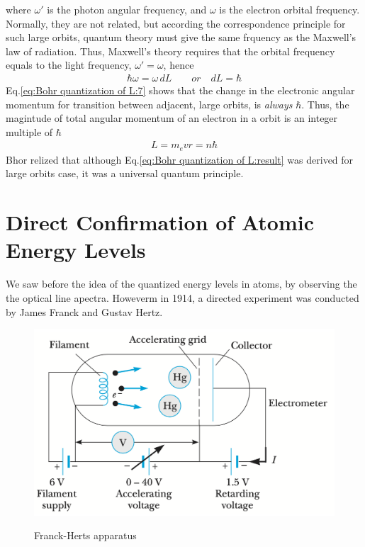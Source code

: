         where $\omega'$ is the photon angular frequency, and $\omega$ is the electron orbital frequency. Normally, they are not related, but according the correspondence
        principle for such large orbits, quantum theory must give the same frquency as the Maxwell's law of radiation. Thus, Maxwell's theory requires that 
        the orbital frequency equals to the light frequency, $\omega' = \omega$, hence 
        \begin{align}
            \label{eq:Bohr quantization of L:7}
            \hbar \omega = \omega\, dL \qquad or \quad dL = \hbar
        \end{align}
        Eq.\eqref{eq:Bohr quantization of L:7} shows that the change in the electronic angular momentum for transition between adjacent, large orbits, is \textit{always}
        $\hbar$. Thus, the magintude of total angular momentum of an electron in a orbit is an integer multiple of $\hbar$
        \begin{align}
            \label{eq:Bohr quantization of L:result}
            L = m_e v r = n \hbar
        \end{align}
        Bhor relized that although Eq.\eqref{eq:Bohr quantization of L:result} was derived for large orbits case, it was a universal quantum principle.

    \section{Direct Confirmation of Atomic Energy Levels}
        We saw before the idea of the quantized energy levels in atoms, by observing the the optical line apectra. Howeverm in 1914, a directed experiment was conducted by
        James Franck and Gustav Hertz.

        \begin{figure}
            \includegraphics[width=0.9\linewidth]{figures/Franck-Herts apparatus.png}
            \label{fig:Franck-Herts apparatus}
            \caption{Franck-Herts apparatus}
        \end{figure}

